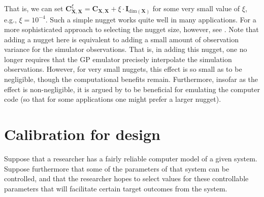 \documentclass{article}
\begin{document}
%
That is, we can set $\mathbf C_{\mathbf X,\mathbf X}^\xi= \mathbf C_{\mathbf X,\mathbf X} + \xi \cdot \mathbf I_{\mathrm{dim}(\mathbf X)}$ for some very small value of $\xi$, e.g., $\xi=10^{-4}$. 
%
Such a simple nugget works quite well in many applications. For a more sophisticated approach to selecting the nugget size, however, see \cite{Ranjan2011}. 
%
Note that adding a nugget here is equivalent to adding a small amount of observation variance for the simulator observations. 
%
That is, in adding this nugget, one no longer requires that the GP emulator precisely interpolate the simulation observations. 
%
However, for very small nuggets, this effect is so small as to be negligible, though the computational benefits remain. 
%
%
Furthermore, insofar as the effect is non-negligible, it is argued by \cite{Gramacy2012} to be beneficial for emulating the computer code (so that for some applications one might prefer a larger nugget).


\section{Calibration for design}\label{calib_for_design}


Suppose that a researcher has a fairly reliable computer model of a given system. 
%
Suppose furthermore that some of the parameters of that system can be controlled, and that the researcher hopes to select values for these controllable parameters that will facilitate certain target outcomes from the system. 
%
\end{document}
